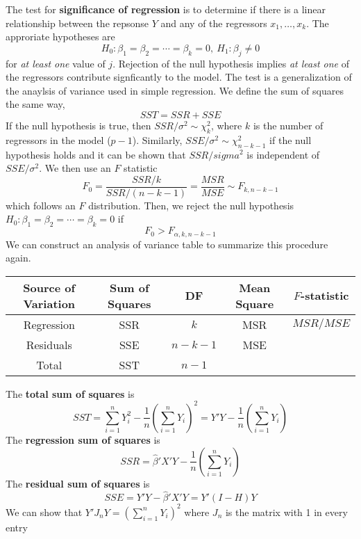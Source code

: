 The test for \textbf{significance of regression} is to determine if there is a linear relationship between the repsonse $Y$ and any of the regressors $x_1, \ldots, x_k$. The approriate hypotheses are 
\[H_0: \beta_1 = \beta_2 = \cdots = \beta_k = 0, \ H_1: \beta_j \neq 0\]
for \emph{at least one} value of $j$. Rejection of the null hypothesis implies \emph{at least one} of the regressors contribute signficantly to the model. The test is a generalization of the anaylsis of variance used in simple regression. We define the sum of squares the same way,
\[SST = SSR + SSE\]
If the null hypothesis is true, then $SSR/\sigma^2 \sim \chi_k^2$, where $k$ is the number of regressors in the model ($p-1$). Similarly, $SSE/\sigma^2 \sim \chi^2_{n-k-1}$ if the null hypothesis holds and it can be shown that $SSR/sigma^2$ is independent of $SSE/\sigma^2$. We then use an $F$ statistic 
\[F_0 = \frac{SSR/k}{SSR/(n-k-1)} = \frac{MSR}{MSE} \sim F_{k,n-k-1}\]
which follows an $F$ distribution. Then, we reject the null hypothesis $H_0: \beta_1 = \beta_2 = \cdots = \beta_k = 0$ if 
\[F_0 > F_{\alpha, k, n-k-1}\]
We can construct an analysis of variance table to summarize this procedure again. 
\begin{center}
    \begin{tabular}{|c|c|c|c|c|}
        \hline
        Source of Variation & Sum of Squares & DF & Mean Square & $F$-statistic\\
        \hline
        \hline
        Regression & SSR & $k$ & MSR & $MSR/MSE$\\
        Residuals & SSE & $n-k-1$ & MSE & \\
        Total & SST & $n-1$ & & \\
        \hline
    \end{tabular}
\end{center}
The \textbf{total sum of squares} is 
\[SST = \sum_{i=1}^n Y_i^2 -  \frac{1}{n}\left(\sum_{i=1}^n Y_i\right)^2 = Y'Y - \frac{1}{n}\left(\sum_{i=1}^n Y_i\right)\]
The \textbf{regression sum of squares} is 
\[SSR = \hat{\beta}'X'Y -\frac{1}{n}\left(\sum_{i=1}^n Y_i\right)\]
The \textbf{residual sum of squares} is 
\[SSE = Y'Y - \hat{\beta}'X'Y = Y'(I - H)Y\]
We can show that $Y'J_{n}Y = \left(\sum_{i=1}^n Y_i\right)^2$ where $J_n$ is the matrix with 1 in every entry
